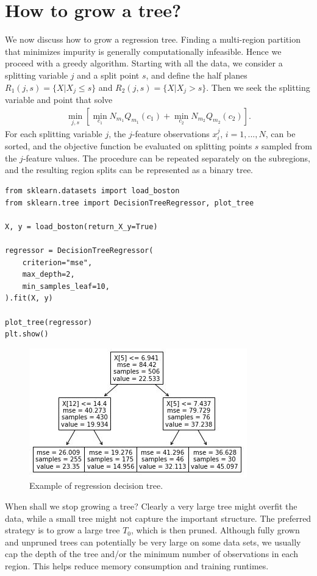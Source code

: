 \documentclass[]{article}
\begin{document}
\section{How to grow a tree?}

\noindent We now discuss how to grow a regression tree. Finding a multi-region partition that minimizes impurity is generally computationally infeasible. Hence we proceed with a greedy algorithm. Starting with all the data, we consider a splitting variable $j$ and a split point $s$, and define the half planes $R_1(j,s)=\{ X | X_j\leq s\}$ and $R_2(j,s)=\{ X | X_j>s\}$. Then we seek the splitting variable and point that solve
\begin{eqnarray}
\min_{j,s}\left[\min_{c_1} N_{m_1}Q_{m_1}(c_1)+\min_{c_2} N_{m_2}Q_{m_2}(c_2) \right].
\end{eqnarray}
For each splitting variable $j$, the $j$-feature observations $x_i^j$, $i=1,...,N$, can be sorted, and the objective function be evaluated on splitting points $s$ sampled from the $j$-feature values. The procedure can be repeated separately on the subregions, and the resulting region splits can be represented as a binary tree.

\begin{lstlisting}
from sklearn.datasets import load_boston
from sklearn.tree import DecisionTreeRegressor, plot_tree

X, y = load_boston(return_X_y=True)

regressor = DecisionTreeRegressor(
    criterion="mse",
    max_depth=2, 
    min_samples_leaf=10,
).fit(X, y)

plot_tree(regressor)
plt.show()
\end{lstlisting}

\begin{figure}[H]
\center \includegraphics[scale=1]{tree-example}
\caption{Example of regression decision tree.}
\end{figure}

\noindent When shall we stop growing a tree? Clearly a very large tree might overfit the data, while a small tree might not capture the important structure. The preferred strategy is to grow a large tree $T_0$, which is then pruned. Although fully grown and unpruned trees can potentially be very large on some data sets, we usually cap the depth of the tree and/or the minimum number of observations in each region. This helps reduce memory consumption and training runtimes.
\end{document}
